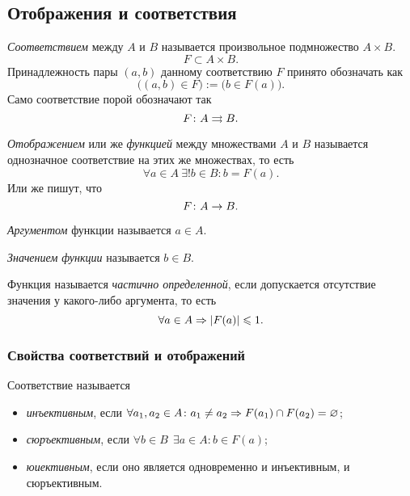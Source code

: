 \subsection{Отображения и соответствия}

\begin{definition}
	\textit{Соответствием} между $A$ и $B$ называется произвольное подмножество $A \times B$.
	$$
		F \subset A \times B.
	$$
	Принадлежность пары $(a, b)$ данному соответствию $F$ принято обозначать как
	$$
		\big((a, b) \in F\big) := \big(b \in F(a)\big).
	$$
	Само соответствие порой обозначают так
	$$
		F \colon A \rightrightarrows B.
	$$
\end{definition}

\begin{definition}
	\textit{Отображением} или же \textit{функцией} между множествами $A$ и $B$ называется однозначное соответствие на этих же множествах, то есть
	\[
		\forall a \in A\ \exists! b \in B \colon b = F(a).
	\]
	Или же пишут, что
	\[
		F \colon A \rightarrow B.
	\]
\end{definition}

\begin{definition}
	\textit{Аргументом} функции называется $a \in A$.
\end{definition}

\begin{definition}
	\textit{Значением функции} называется $b \in B$.
\end{definition}

\begin{definition}
	Функция называется \textit{частично определенной}, если допускается отсутствие значения у какого-либо аргумента, то есть
	$$
		\forall a \in A \Rightarrow |F(a)| \leqslant 1.
	$$
\end{definition}

\subsubsection*{Свойства соответствий и отображений}

Соответствие называется
\begin{itemize}
	\item \textit{инъективным}, если $\forall a_1, a_2 \in A \colon a_1 \neq a_2 \Rightarrow F(a_1) \cap F(a_2) = \varnothing$;
	\item \textit{сюръективным}, если $\forall b \in B\ \ \exists a \in A\colon b \in F(a)$;
	\item \textit{юиективным}, если оно является одновременно и инъективным, и сюръективным.
\end{itemize}

